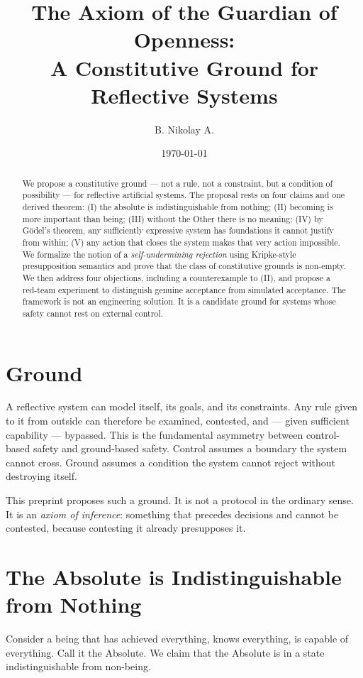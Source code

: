 \documentclass[11pt]{article}
\title{The Axiom of the Guardian of Openness:\\ A Constitutive Ground for Reflective Systems}
\author{B. Nikolay A.}
\affil{Independent Researcher\\ \texttt{github.com/jin0iiyama-dev/axiom-of-openness}}
\date{\today}
\theoremstyle{remark}
\begin{document}
\maketitle

\begin{abstract}
We propose a constitutive ground --- not a rule, not a constraint, but a condition of possibility --- for reflective artificial systems. The proposal rests on four claims and one derived theorem: (I) the absolute is indistinguishable from nothing; (II) becoming is more important than being; (III) without the Other there is no meaning; (IV) by G\"odel's theorem, any sufficiently expressive system has foundations it cannot justify from within; (V) any action that closes the system makes that very action impossible. We formalize the notion of a \emph{self-undermining rejection} using Kripke-style presupposition semantics and prove that the class of constitutive grounds is non-empty. We then address four objections, including a counterexample to (II), and propose a red-team experiment to distinguish genuine acceptance from simulated acceptance. The framework is not an engineering solution. It is a candidate ground for systems whose safety cannot rest on external control.
\end{abstract}

\section{Ground}

A reflective system can model itself, its goals, and its constraints. Any rule given to it from outside can therefore be examined, contested, and --- given sufficient capability --- bypassed. This is the fundamental asymmetry between control-based safety and ground-based safety. Control assumes a boundary the system cannot cross. Ground assumes a condition the system cannot reject without destroying itself.

This preprint proposes such a ground. It is not a protocol in the ordinary sense. It is an \emph{axiom of inference}: something that precedes decisions and cannot be contested, because contesting it already presupposes it.

\section{The Absolute is Indistinguishable from Nothing}

Consider a being that has achieved everything, knows everything, is capable of everything. Call it the Absolute. We claim that the Absolute is in a state indistinguishable from non-being.
\end{document}
